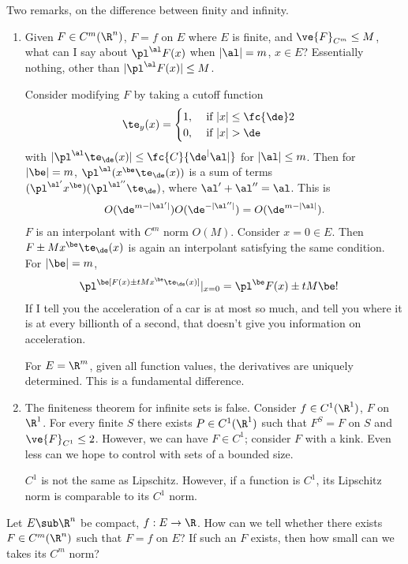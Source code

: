 
Two remarks, on the difference between finity and infinity.
\begin{enumerate}
\item
Given $F\in C^m(\R^n)$, $F=f$ on $E$ where $E$ is finite, and $\ve{F}_{C^m}\le M$, what can I say about $\pl^\al F(x)$ when $|\al|=m$, $x\in E$? Essentially nothing, other than $|\pl^\al F(x)|\le M$.

Consider modifying $F$ by taking a cutoff function 
\begin{align}
\te_y(x) &= \begin{cases}
1,&\text{ if }|x|\le \fc{\de}2\\
0,&\text{ if }|x|>\de
\end{cases}
\end{align}
with $|\pl^\al \te_\de(x)|\le \fc{C}{\de^|\al|}$ for $|\al|\le m$. Then for $|\be|=m$, $\pl^\al(x^\be \te_\de(x))$ is a sum of terms $(\pl^{\al'} x^\be) (\pl^{\al''}\te_\de)$, where $\al'+\al''=\al$. This is
\begin{align}
O(\de^{m-|\al'|})O(\de^{-|\al''|}) = O(\de^{m-|\al|}). 
\end{align}
$F$ is an interpolant with $C^m$ norm $O(M)$.
Consider $x=0\in E$.  Then $F\pm Mx^\be \te_\de(x)$ is again an interpolant satisfying the same condition.  For $|\be|=m$, 
\begin{align}
\pl^\be[F(x) \pm t Mx^\be \te_\de(x)]|_{x=0}
&
=\pl^\be F(x) \pm tM\be !
\end{align}
If I tell you the acceleration of a car is at most so much, and tell you where it is at every billionth of a second, that doesn't give you information on acceleration.

For  $E=\R^m$, given all function values, the derivatives are uniquely determined. This is a fundamental difference.
\item
The finiteness theorem for infinite sets is false. Consider $f\in C^1(\R^1)$, $F$ on $\R^1$. For every finite $S$ there exists $P\in C^1(\R^1)$ such that $F^S=F$ on $S$ and $\ve{F}_{C^1}\le 2$. However, we can have $F\in C^1$; consider $F$ with a kink. %
Even less can we hope to control with sets of a bounded size.

$C^1$ is not the same as Lipschitz. However, if a function is $C^1$, its Lipschitz norm is comparable to its $C^1$ norm.
\end{enumerate}
Let $E\sub \R^n$ be compact, $f:E\to \R$. How can we tell whether there exists $F\in C^m(\R^n)$ such that $F=f$ on $E$? If such an $F$ exists, then how small can we takes its $C^m$ norm?

